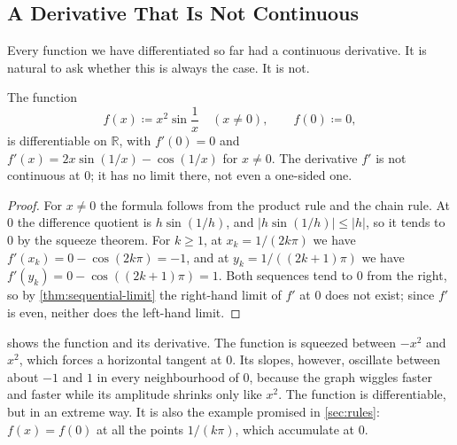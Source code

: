 \subsection{A Derivative That Is Not Continuous}

Every function we have differentiated so far had a continuous derivative. It is natural to ask whether this is always the case. It is not.

\begin{proposition}
\label{prop:x2sin}
The function
\[
f(x)\coloneqq x^2\sin\frac1x\quad(x\ne0),\qquad f(0)\coloneqq0,
\]
is differentiable on $\mathbb R$, with $f'(0)=0$ and $f'(x)=2x\sin(1/x)-\cos(1/x)$ for $x\ne0$. The derivative $f'$ is not continuous at $0$; it has no limit there, not even a one-sided one.
\end{proposition}

\begin{proof}
For $x\ne0$ the formula follows from the product rule and the chain rule. At $0$ the difference quotient is $h\sin(1/h)$, and $|h\sin(1/h)|\le|h|$, so it tends to $0$ by the squeeze theorem. For $k\ge1$, at $x_k=1/(2k\pi)$ we have $f'(x_k)=0-\cos(2k\pi)=-1$, and at $y_k=1/((2k+1)\pi)$ we have $f'(y_k)=0-\cos((2k+1)\pi)=1$. Both sequences tend to $0$ from the right, so by \cref{thm:sequential-limit} the right-hand limit of $f'$ at $0$ does not exist; since $f'$ is even, neither does the left-hand limit.
\end{proof}

 shows the function and its derivative. The function is squeezed between $-x^2$ and $x^2$, which forces a horizontal tangent at $0$. Its slopes, however, oscillate between about $-1$ and $1$ in every neighbourhood of $0$, because the graph wiggles faster and faster while its amplitude shrinks only like $x^2$. The function is differentiable, but in an extreme way. It is also the example promised in \cref{sec:rules}: $f(x)=f(0)$ at all the points $1/(k\pi)$, which accumulate at $0$.

